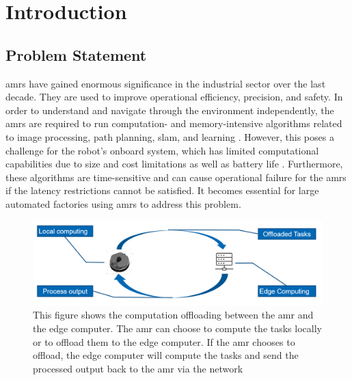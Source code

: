 \chapter{Introduction}\label{ch:introduction}

\section{Problem Statement}\label{sec:introduction:problem_statement}

\glspl{amr} have gained enormous significance in the industrial sector over the last decade. They are used to improve operational efficiency, precision, and safety. In order to understand and navigate through the environment independently, the \glspl{amr} are required to run computation- and memory-intensive algorithms related to image processing, path planning, \gls{slam}, and learning \cite{Saeik2021}. However, this poses a challenge for the robot's onboard system, which has limited computational capabilities due to size and cost limitations as well as battery life \cite{Baxi2022}. Furthermore, these algorithms are time-sensitive and can cause operational failure for the \glspl{amr} if the latency restrictions cannot be satisfied. It becomes essential for large automated factories using \glspl{amr} to address this problem. 

\begin{figure}[htb]
    \centering

    \includegraphics[width=0.8\linewidth]{figures/setup/amr_offloading.png}
    \caption[Computation offloading between \acrshort{amr} and edge computer]{This figure shows the computation offloading between the \gls{amr} and the edge computer. The \gls{amr} can choose to compute the tasks locally or to offload them to the edge computer. If the \gls{amr} chooses to offload, the edge computer will compute the tasks and send the processed output back to the \gls{amr} via the network} 

    \label{fig:amr_offloading}
\end{figure}

